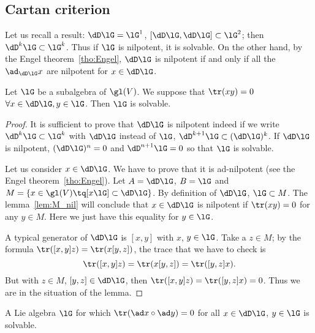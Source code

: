 
\subsection{Cartan criterion}

Let us recall a result: $\dD\lG=\lG^1$, $[\dD\lG,\dD\lG]\subset\lG^2$; then $\dD^k\lG\subset\lG^k$. Thus if $\lG$ is nilpotent, it is solvable. On the other hand, by the Engel theorem~\ref{tho:Engel}, $\dD\lG$ is nilpotent if and only if all the $\ad_{\dD\lG}x$ are nilpotent for $x\in\dD\lG$.


\begin{theorem}
	Let $\lG$ be a subalgebra of $\gl(V)$. We suppose that $\tr(xy)=0$ $\forall x\in\dD\lG, y\in\lG$. Then $\lG$ is solvable.
\end{theorem}

\begin{proof}
	It is sufficient to prove that $\dD\lG$ is nilpotent indeed if we write $\dD^k\lG\subset\lG^k$ with $\dD\lG$ instead of $\lG$, $\dD^{k+1}\lG\subset(\dD\lG)^k$. If $\dD\lG$ is nilpotent, $(\dD\lG)^n=0$ and $\dD^{n+1}\lG=0$ so that $\lG$ is solvable.

	Let us consider $x\in\dD\lG$. We have to prove that it is ad-nilpotent (see the Engel theorem~\ref{tho:Engel}). Let $A=\dD\lG$, $B=\lG$ and $M=\{x\in\gl(V)\tq [x\lG]\subset\dD\lG\}$. By definition of $\dD\lG$, $\lG\subset M$. The lemma~\ref{lem:M_nil} will conclude that $x\in\dD\lG$ is nilpotent if $\tr(xy)=0$ for any $y\in M$. Here we just have this equality for $y\in\lG$.

	A typical generator of $\dD\lG$ is $[x,y]$ with $x$, $y\in\lG$. Take a $z\in M$; by the formula $\tr([x,y]z)=\tr(x[y,z])$, the trace that we have to check is
	\begin{equation}
		\tr([x,y]z)=\tr(x[y,z])
		=\tr([y,z]x).
	\end{equation}
	But with $z\in M$, $[y,z]\in\dD\lG$, then $\tr([x,y]z)=\tr([y,z]x)=0$. Thus we are in the situation of the lemma.
\end{proof}


\begin{corollary}\label{cor:ad_g_sol}
	A Lie algebra $\lG$ for which $\tr(\ad x\circ\ad y)=0$ for all $x\in\dD\lG$, $y\in\lG$ is solvable.
\end{corollary}

